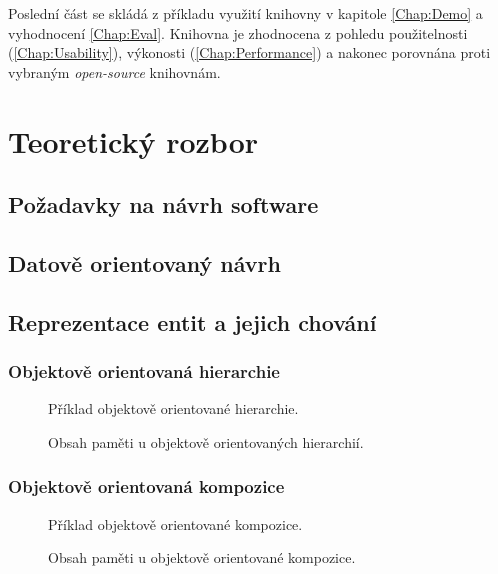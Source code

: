 Poslední část se skládá z příkladu využití knihovny v kapitole \ref{Chap:Demo} a vyhodnocení \ref{Chap:Eval}. Knihovna je zhodnocena z pohledu použitelnosti (\ref{Chap:Usability}), výkonosti (\ref{Chap:Performance}) a nakonec porovnána proti vybraným \emph{open-source} knihovnám.

\chapter{Teoretický rozbor}
\blind[1]

\section{Požadavky na návrh software}
\blind[2]

\section{Datově orientovaný návrh}
\label{Chap:DDD}
\blind[4]

\section{Reprezentace entit a jejich chování}
\blind[2]

\subsection{Objektově orientovaná hierarchie}
\begin{figure}[H]
	\caption{Příklad objektově orientované hierarchie. }
\end{figure}
\begin{figure}[H]
	\caption{Obsah paměti u objektově orientovaných hierarchií. }
\end{figure}
\blind[3]

\subsection{Objektově orientovaná kompozice}
\begin{figure}[H]
	\caption{Příklad objektově orientované kompozice. }
\end{figure}
\begin{figure}[H]
	\caption{Obsah paměti u objektově orientované kompozice. }
\end{figure}
\blind[3]

